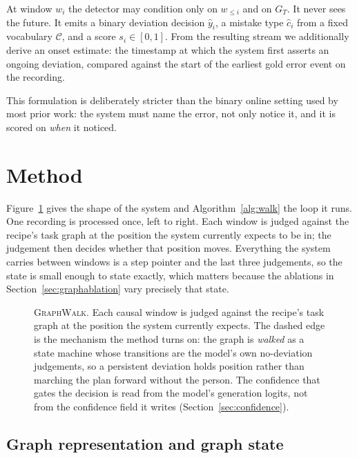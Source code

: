 \documentclass[10pt,twocolumn]{article}
\newcommand{\ourmodel}{\textsc{GraphWalk}}
\begin{document}
At window $w_i$ the detector may condition only on $w_{\le i}$ and on $G_T$. It
never sees the future. It emits a binary deviation decision $\hat y_i$, a mistake
type $\hat c_i$ from a fixed vocabulary $\mathcal{C}$, and a score
$s_i\in[0,1]$. From the resulting stream we additionally derive an onset
estimate: the timestamp at which the system first asserts an ongoing deviation,
compared against the start of the earliest gold error event on the recording.

This formulation is deliberately stricter than the binary online setting used by
most prior work: the system must name the error, not only notice it, and it is
scored on \emph{when} it noticed.

\section{Method}
\label{sec:method}

Figure~\ref{fig:pipeline} gives the shape of the system and
Algorithm~\ref{alg:walk} the loop it runs. One recording is processed once,
left to right. Each window is judged against the recipe's task graph at the
position the system currently expects to be in; the judgement then decides
whether that position moves. Everything the system carries between windows is a
step pointer and the last three judgements, so the state is small enough to
state exactly, which matters because the ablations in
Section~\ref{sec:graphablation} vary precisely that state.

\begin{figure}[t]
\centering
\resizebox{0.98\textwidth}{!}{}
\caption{\ourmodel{}. Each causal window is judged against the recipe's task
graph at the position the system currently expects. The dashed edge is the
mechanism the method turns on: the graph is \emph{walked} as a state machine
whose transitions are the model's own no-deviation judgements, so a persistent
deviation holds position rather than marching the plan forward without the
person. The confidence that gates the decision is read from the model's
generation logits, not from the confidence field it writes
(Section~\ref{sec:confidence}).}
\label{fig:pipeline}
\end{figure}

\subsection{Graph representation and graph state}
\end{document}
